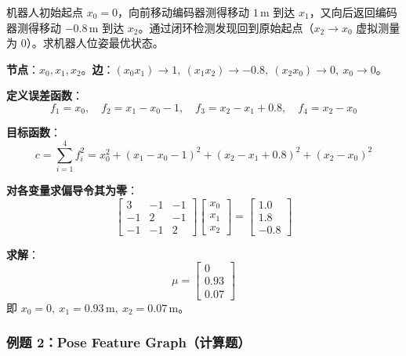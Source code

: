 \documentclass[11pt,a4paper]{article}
\begin{document}
\begin{example}
机器人初始起点 $x_0=0$，向前移动编码器测得移动 $1\,\mathrm{m}$ 到达 $x_1$，又向后返回编码器测得移动 $-0.8\,\mathrm{m}$ 到达 $x_2$。通过闭环检测发现回到原始起点（$x_2\to x_0$ 虚拟测量为 $0$）。求机器人位姿最优状态。

\textbf{节点}：$x_0,x_1,x_2$。\quad \textbf{边}：$(x_0x_1)\to 1,\ (x_1x_2)\to -0.8,\ (x_2x_0)\to 0,\ x_0\to 0$。

\textbf{定义误差函数}：
\[
f_1=x_0,\quad f_2=x_1-x_0-1,\quad f_3=x_2-x_1+0.8,\quad f_4=x_2-x_0
\]

\textbf{目标函数}：
\[
c=\sum_{i=1}^4 f_i^2=x_0^2+(x_1-x_0-1)^2+(x_2-x_1+0.8)^2+(x_2-x_0)^2
\]

\textbf{对各变量求偏导令其为零}：
\[
\begin{bmatrix}3 & -1 & -1\\ -1 & 2 & -1\\ -1 & -1 & 2\end{bmatrix}
\begin{bmatrix}x_0\\ x_1\\ x_2\end{bmatrix}
=
\begin{bmatrix}1.0\\ 1.8\\ -0.8\end{bmatrix}
\]

\textbf{求解}：
\[
\mu=\begin{bmatrix}0\\ 0.93\\ 0.07\end{bmatrix}
\]
即 $x_0=0,\ x_1=0.93\,\mathrm{m},\ x_2=0.07\,\mathrm{m}$。
\end{example}

\subsubsection*{例题 2：Pose Feature Graph（计算题）}
\end{document}
